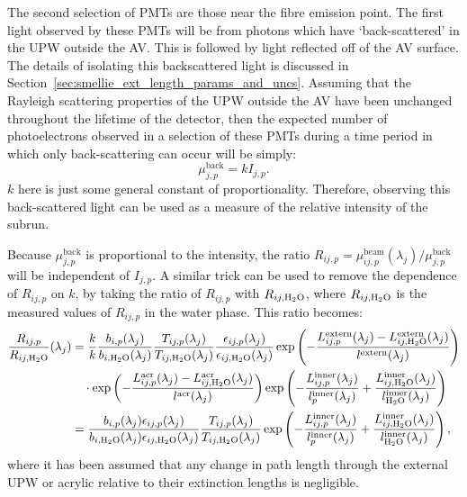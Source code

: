 The second selection of PMTs are those near the fibre emission point. The first light observed by these PMTs will be from photons which have `back-scattered' in the UPW outside the AV. This is followed by light reflected off of the AV surface. The details of isolating this backscattered light is discussed in Section~\ref{sec:smellie_ext_length_params_and_uncs}. Assuming that the Rayleigh scattering properties of the UPW outside the AV have been unchanged throughout the lifetime of the detector, then the expected number of photoelectrons observed in a selection of these PMTs during a time period in which only back-scattering can occur will be simply:
\begin{equation}
    \mu_{j,p}^{\mathrm{back}} = kI_{j,p}.
\end{equation}
$k$ here is just some general constant of proportionality. Therefore, observing this back-scattered light can be used as a measure of the relative intensity of the subrun.

Because $\mu_{j,p}^{\mathrm{back}}$ is proportional to the intensity, the ratio $R_{ij,p} = \mu_{ij,p}^{\mathrm{beam}}(\lambda_{j})/\mu_{j,p}^{\mathrm{back}}$ will be independent of $I_{j,p}$. A similar trick can be used to remove the dependence of $R_{ij,p}$ on $k$, by taking the ratio of $R_{ij,p}$ with $R_{ij,\ce{H_{2}O}}$, where $R_{ij,\ce{H_{2}O}}$ is the measured values of $R_{ij,p}$ in the water phase. This ratio becomes:
\begin{align}
    \frac{R_{ij,p}}{R_{ij,\ce{H_{2}O}}}(\lambda_{j}) 
    &= \frac{k}{k}
    \frac{b_{i,p}(\lambda_{j})}{b_{i,\ce{H_{2}O}}(\lambda_{j})}
    \frac{T_{ij,p}(\lambda_{j})}{T_{ij,\ce{H_{2}O}}(\lambda_{j})}
    \frac{\epsilon_{ij,p}(\lambda_{j})}{\epsilon_{ij,\ce{H_{2}O}}(\lambda_{j})}
    \exp\left(
        -\frac{L_{ij,p}^{\mathrm{extern}}(\lambda_{j})-L_{ij,\ce{H_{2}O}}^{\mathrm{extern}}(\lambda_{j})}{l^{\mathrm{extern}}(\lambda_{j})}
    \right)
    \nonumber\\
    & \quad \cdot \exp\left(
        -\frac{L_{ij,p}^{\mathrm{acr}}(\lambda_{j})-L_{ij,\ce{H_{2}O}}^{\mathrm{acr}}(\lambda_{j})}{l^{\mathrm{acr}}(\lambda_{j})}
    \right)
    \exp\left(
        -\frac{L_{ij,p}^{\mathrm{inner}}(\lambda_{j})}{l_{p}^{\mathrm{inner}}(\lambda_{j})}
        +\frac{L_{ij,\ce{H_{2}O}}^{\mathrm{inner}}(\lambda_{j})}{l_{\ce{H_{2}O}}^{\mathrm{inner}}(\lambda_{j})}
    \right)
    \nonumber\\
    &= \frac{b_{i,p}(\lambda_{j})\epsilon_{ij,p}(\lambda_{j})}{b_{i,\ce{H_{2}O}}(\lambda_{j})\epsilon_{ij,\ce{H_{2}O}}(\lambda_{j})}
    \frac{T_{ij,p}(\lambda_{j})}{T_{ij,\ce{H_{2}O}}(\lambda_{j})}
    \exp\left(
        -\frac{L_{ij,p}^{\mathrm{inner}}(\lambda_{j})}{l_{p}^{\mathrm{inner}}(\lambda_{j})}
        +\frac{L_{ij,\ce{H_{2}O}}^{\mathrm{inner}}(\lambda_{j})}{l_{\ce{H_{2}O}}^{\mathrm{inner}}(\lambda_{j})}
    \right),
\end{align}
where it has been assumed that any change in path length through the external UPW or acrylic relative to their extinction lengths is negligible.

